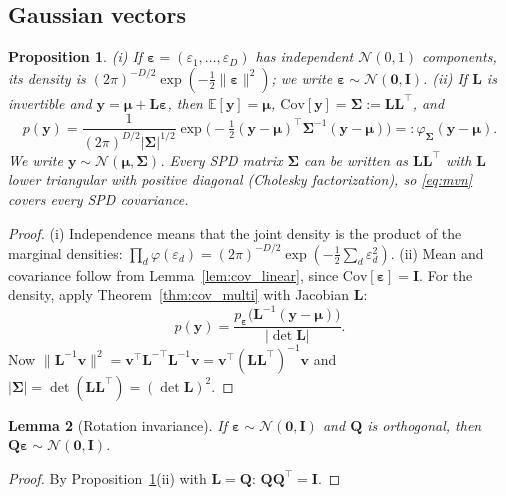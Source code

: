 \documentclass[11pt,a4paper]{article}
\numberwithin{equation}{section}
\theoremstyle{plain}
\newtheorem{proposition}{Proposition}[section]
\newtheorem{lemma}[proposition]{Lemma}
\theoremstyle{definition}
\theoremstyle{remark}
\newcommand{\y}{\mathbf{y}}
\newcommand{\vv}{\mathbf{v}}
\newcommand{\eps}{\bm{\varepsilon}}
\newcommand{\mub}{\bm{\mu}}
\newcommand{\Sig}{\bm{\Sigma}}
\newcommand{\Lb}{\mathbf{L}}
\newcommand{\Qb}{\mathbf{Q}}
\newcommand{\I}{\mathbf{I}}
\newcommand{\E}{\mathbb{E}}
\newcommand{\Cov}{\mathrm{Cov}}
\newcommand{\N}{\mathcal{N}}
\begin{document}
\subsection{Gaussian vectors}
\begin{proposition}
\label{prop:mvn}
(i) If $\eps=(\varepsilon_1,\dots,\varepsilon_D)$ has independent $\N(0,1)$ components, its density is $(2\pi)^{-D/2}\exp(-\tfrac12\|\eps\|^2)$; we write $\eps\sim\N(\mathbf0,\I)$.
(ii) If $\Lb$ is invertible and $\y=\mub+\Lb\eps$, then $\E[\y]=\mub$, $\Cov[\y]=\Sig:=\Lb\Lb^\top$, and
\begin{equation}
p(\y)=\frac{1}{(2\pi)^{D/2}|\Sig|^{1/2}}\exp\Big(-\tfrac12(\y-\mub)^\top\Sig^{-1}(\y-\mub)\Big)=:\varphi_{\Sig}(\y-\mub).
\label{eq:mvn}
\end{equation}
We write $\y\sim\N(\mub,\Sig)$. Every SPD matrix $\Sig$ can be written as $\Lb\Lb^\top$ with $\Lb$ lower triangular with positive diagonal (Cholesky factorization), so \eqref{eq:mvn} covers every SPD covariance.
\end{proposition}
\begin{proof}
(i) Independence means that the joint density is the product of the marginal densities: $\prod_d\varphi(\varepsilon_d)=(2\pi)^{-D/2}\exp(-\tfrac12\sum_d\varepsilon_d^2)$.
(ii) Mean and covariance follow from Lemma~\ref{lem:cov_linear}, since $\Cov[\eps]=\I$. For the density, apply Theorem~\ref{thm:cov_multi} with Jacobian $\Lb$:
\begin{equation*}
p(\y)=\frac{p_{\eps}\big(\Lb^{-1}(\y-\mub)\big)}{|\det\Lb|}.
\end{equation*}
Now $\|\Lb^{-1}\vv\|^2=\vv^\top\Lb^{-\top}\Lb^{-1}\vv=\vv^\top(\Lb\Lb^\top)^{-1}\vv$ and $|\Sig|=\det(\Lb\Lb^\top)=(\det\Lb)^2$.
\end{proof}

\begin{lemma}[Rotation invariance]
\label{lem:rotation}
If $\eps\sim\N(\mathbf0,\I)$ and $\Qb$ is orthogonal, then $\Qb\eps\sim\N(\mathbf0,\I)$.
\end{lemma}
\begin{proof}
By Proposition~\ref{prop:mvn}(ii) with $\Lb=\Qb$: $\Qb\Qb^\top=\I$.
\end{proof}
\end{document}

